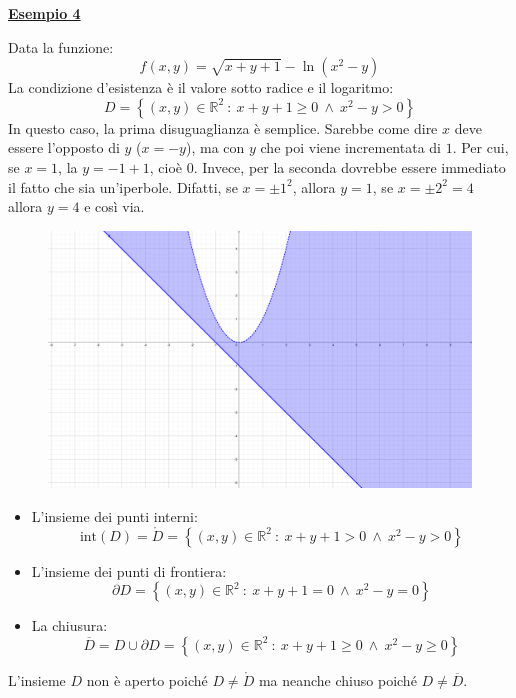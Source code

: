 \documentclass[a4paper]{article}
\newcommand{\example}[1]{\textcolor{Green4}{\textbf{#1}}}
\begin{document}
	\begin{flushleft}
		\example{\underline{Esempio 4}}
	\end{flushleft}

	\noindent
	Data la funzione:
	\begin{equation*}
		f\left(x,y\right) = \sqrt{x+y+1} - \ln\left(x^{2} - y\right)
	\end{equation*}
	La condizione d'esistenza è il valore sotto radice e il logaritmo:
	\begin{equation*}
		D = \left\{\left(x,y\right) \in \mathbb{R}^{2} \: : \: x+y+1 \ge 0 \: \land \: x^{2}-y > 0\right\}
	\end{equation*}
	In questo caso, la prima disuguaglianza è semplice. Sarebbe come dire $x$ deve essere l'opposto di $y$ ($x = -y$), ma con $y$ che poi viene incrementata di $1$. Per cui, se $x = 1$, la $y = -1 + 1$, cioè $0$. Invece, per la seconda dovrebbe essere immediato il fatto che sia un'iperbole. Difatti, se $x=\pm1^{2}$, allora $y = 1$, se $x=\pm2^{2}=4$ allora $y=4$ e così via.
	\begin{figure}[!htp]
		\centering
		\includegraphics[width=.7\textwidth]{img/dominio_di_funzioni-4.pdf}
	\end{figure}
	\begin{itemize}
		\item L'insieme dei punti interni:
		\begin{equation*}
			\mathrm{int}\left(D\right) = \mathring{D} = \left\{\left(x,y\right) \in \mathbb{R}^{2} \: : \: x+y+1 > 0 \: \land \: x^{2}-y > 0\right\}
		\end{equation*}

		\item L'insieme dei punti di frontiera:
		\begin{equation*}
			\partial D = \left\{\left(x,y\right) \in \mathbb{R}^{2} \: : \: x+y+1 = 0 \: \land \: x^{2}-y = 0\right\}
		\end{equation*}

		\item La chiusura:
		\begin{equation*}
			\overline{D} = D \cup \partial D = \left\{\left(x,y\right) \in \mathbb{R}^{2} \: : \: x+y+1 \ge 0 \: \land \: x^{2}-y \ge 0\right\}
		\end{equation*}
	\end{itemize}
	L'insieme $D$ non è aperto poiché $D \ne \mathring{D}$ ma neanche chiuso poiché $D \ne \overline{D}$.\newpage
\end{document}
